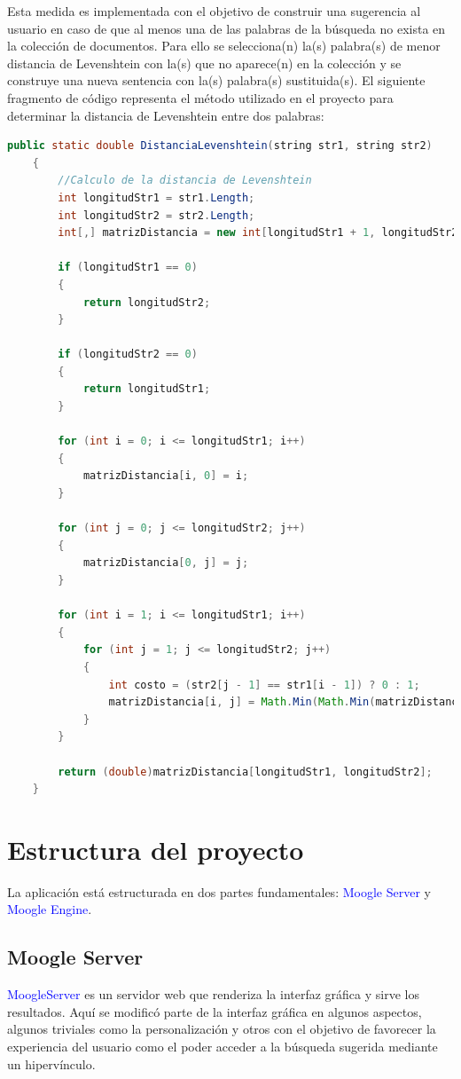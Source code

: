 \documentclass[a4paper, 12pt]{article}
\begin{document}
 Esta medida es implementada con el objetivo de construir una sugerencia al usuario en caso de que al menos una de las palabras de la búsqueda no exista en la colección de documentos. Para ello se selecciona(n) la(s) palabra(s) de menor distancia de Levenshtein con la(s) que no aparece(n) en la colección y se construye una nueva sentencia con la(s) palabra(s) sustituida(s).
El siguiente fragmento de código representa el método utilizado en el proyecto para determinar la distancia de Levenshtein entre dos palabras:
\begin{lstlisting}[language= Java]
public static double DistanciaLevenshtein(string str1, string str2)
    {
        //Calculo de la distancia de Levenshtein
        int longitudStr1 = str1.Length;
        int longitudStr2 = str2.Length;
        int[,] matrizDistancia = new int[longitudStr1 + 1, longitudStr2 + 1];

        if (longitudStr1 == 0)
        {
            return longitudStr2;
        }

        if (longitudStr2 == 0)
        {
            return longitudStr1;
        }

        for (int i = 0; i <= longitudStr1; i++)
        {
            matrizDistancia[i, 0] = i;
        }

        for (int j = 0; j <= longitudStr2; j++)
        {
            matrizDistancia[0, j] = j;
        }

        for (int i = 1; i <= longitudStr1; i++)
        {
            for (int j = 1; j <= longitudStr2; j++)
            {
                int costo = (str2[j - 1] == str1[i - 1]) ? 0 : 1;
                matrizDistancia[i, j] = Math.Min(Math.Min(matrizDistancia[i - 1, j] + 1, matrizDistancia[i, j - 1] + 1), matrizDistancia[i - 1, j - 1] + costo);
            }
        }

        return (double)matrizDistancia[longitudStr1, longitudStr2];
    }
\end{lstlisting}


\newpage
\section{Estructura del proyecto}\label{sec;class}
La aplicación está estructurada en dos partes fundamentales: \textcolor{blue}{Moogle Server} y \textcolor{blue}{Moogle Engine}.

\subsection{Moogle Server}\label{sub;serv}
   \textcolor{blue}{MoogleServer} es un servidor web que renderiza la interfaz gráfica y sirve los resultados. Aquí se modificó parte de la interfaz gráfica en algunos aspectos, algunos triviales como la personalización y otros con el objetivo de favorecer la experiencia del usuario como el poder acceder a la búsqueda sugerida mediante un hipervínculo.
\end{document}
